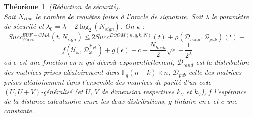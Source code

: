 \documentclass[12pt]{article}
\theoremstyle{plain}
\newtheorem{thm}{Théorème}[section]
\newcommand{\F}{\mathbb{F}}
\begin{document}
\begin{thm} (Réduction de sécurité). \\
Soit $N_{sign}$ le nombre de requêtes faites à l'oracle de signature. Soit $\lambda$ le paramètre de sécurité et $\lambda_0=\lambda + 2\log_2(N_{sign})$. On a :
$$Succ^{EUF-CMA}_{Wave}(t,N_{sign}) \leq 2Succ^{DOOM(n,q,k,N)}(t) +\rho(\mathcal{D}_{rand},\mathcal{D}_{pub})(t) + $$
$$ f(\mathcal{U}_{\omega},\mathcal{D}_{\omega}^{\mathbf{H}_{pk}}) + g(\epsilon) + c + \frac{N_{hash}}{2}\sqrt{\epsilon} + \frac{1}{2^{\lambda}}$$
où $\epsilon$ est une fonction en $n$ qui décroît exponentiellement, $\mathcal{D}_{rand}$ est la distribution des matrices prises aléatoirement dans $\F_q{(n-k)\times n}$, $\mathcal{D}_{pub}$ celle des matrices prises aléatoirement dans l'ensemble des matrices de parité d'un code $(U,U+V)$-généralisé (et $U$, $V$ de dimension respectives $k_U$ et $k_V$), $f$ l'espérance de la distance calculatoire entre les deux distributions, $g$ linéaire en $\epsilon$ et $c$ une constante.
\end{thm}
\end{document}
